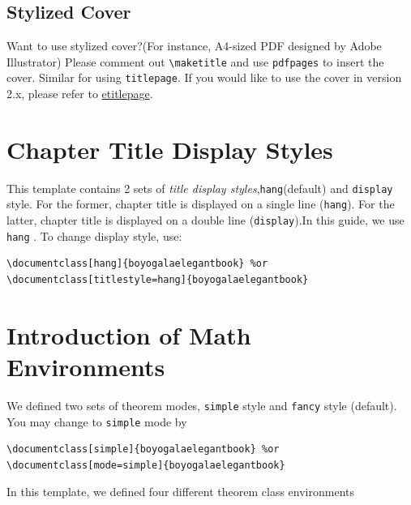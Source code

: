 \documentclass[11pt]{boyogalaelegantbook}
\begin{document}
\subsection{Stylized Cover}
Want to use stylized cover?(For instance, A4-sized PDF designed by Adobe Illustrator) Please comment out \lstinline{\maketitle} and use \lstinline{pdfpages} to insert the cover. Similar for using \lstinline{titlepage}. If you would like to use the cover in version 2.x, please refer to \href{https://github.com/EthanDeng/etitlepage}{etitlepage}.

\section{Chapter Title Display Styles}

This template contains 2 sets of \textit{title display styles},\lstinline{hang}(default) and \lstinline{display} style. For the former, chapter title is displayed on a single line (\lstinline{hang}). For the latter, chapter title is displayed on a double line (\lstinline{display}).In this guide, we use \lstinline{hang} . To change display style, use:
\begin{lstlisting}
\documentclass[hang]{boyogalaelegantbook} %or
\documentclass[titlestyle=hang]{boyogalaelegantbook}
\end{lstlisting}


\section{Introduction of Math Environments}
We defined two sets of theorem modes, \lstinline{simple} style and \lstinline{fancy} style (default). You may change to \lstinline{simple} mode by

\begin{lstlisting}
\documentclass[simple]{boyogalaelegantbook} %or
\documentclass[mode=simple]{boyogalaelegantbook}
\end{lstlisting}

In this template, we defined four different theorem class environments
\end{document}
